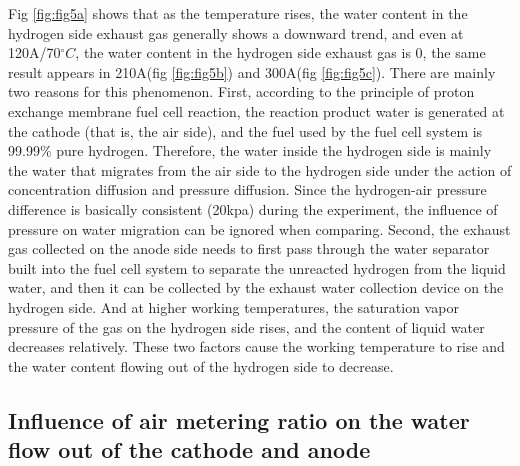 
\par
Fig \ref{fig:fig5a} shows that as the temperature rises, the water content in the hydrogen side exhaust gas generally shows a downward trend, and even at 120A/70$^{\circ}C$, the water content in the hydrogen side exhaust gas is 0, the same result appears in 210A(fig \ref{fig:fig5b}) and 300A(fig \ref{fig:fig5c}). There are mainly two reasons for this phenomenon.  First, according to the principle of proton exchange membrane fuel cell reaction, the reaction product water is generated at the cathode (that is, the air side), and the fuel used by the fuel cell system is 99.99\% pure hydrogen. Therefore, the water inside the hydrogen side is mainly the water that migrates from the air side to the hydrogen side under the action of concentration diffusion and pressure diffusion. Since the hydrogen-air pressure difference is basically consistent (20kpa) during the experiment, the influence of pressure on water migration can be ignored when comparing. Second, the exhaust gas collected on the anode side needs to first pass through the water separator built into the fuel cell system to separate the unreacted hydrogen from the liquid water, and then it can be collected by the exhaust water collection device on the hydrogen side. And at higher working temperatures, the saturation vapor pressure of the gas on the hydrogen side rises, and the content of liquid water decreases relatively. These two factors cause the working temperature to rise and the water content flowing out of the hydrogen side to decrease.



\subsection{Influence of air metering ratio on the water flow out of the cathode and anode}

